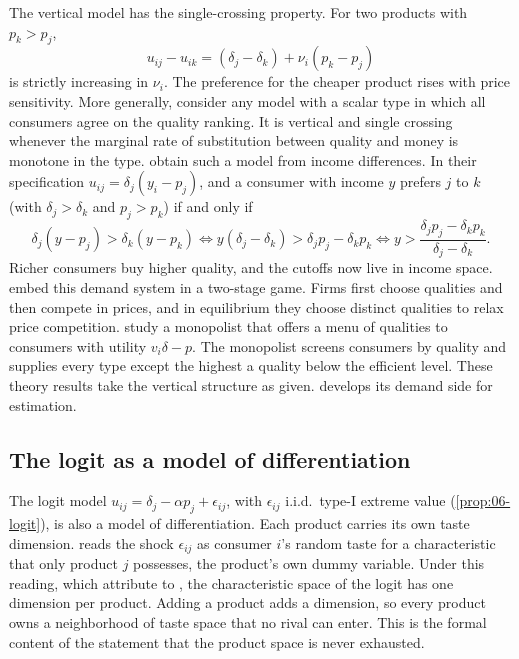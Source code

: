 The vertical model has the single-crossing property. For two products with $p_k > p_j$,
\begin{equation}\label{eq:06-vertical-sc}
  u_{ij} - u_{ik} = (\delta_j - \delta_k) + \nu_i(p_k - p_j)
\end{equation}
is strictly increasing in $\nu_i$. The preference for the cheaper product rises with price sensitivity.
More generally, consider any model with a scalar type in which all consumers agree on the quality ranking.
It is vertical and single crossing whenever the marginal rate of substitution between quality and money
is monotone in the type. \citet{GabszewiczThisse1979} obtain such a model from income differences. In their specification
$u_{ij} = \delta_j(y_i - p_j)$, and a consumer with income $y$ prefers $j$ to $k$ (with $\delta_j > \delta_k$
and $p_j > p_k$) if and only if
\begin{equation*}
  \delta_j(y - p_j) > \delta_k(y - p_k)
  \iff y(\delta_j - \delta_k) > \delta_j p_j - \delta_k p_k
  \iff y > \frac{\delta_j p_j - \delta_k p_k}{\delta_j - \delta_k} .
\end{equation*}
Richer consumers buy higher quality, and the cutoffs now live in income space. \citet{ShakedSutton1982}
embed this demand system in a two-stage game. Firms first choose qualities and then compete in prices,
and in equilibrium they choose distinct qualities to relax price competition. \citet{MussaRosen1978}
study a monopolist that offers a menu of qualities to consumers with utility $v_i\delta - p$. The
monopolist screens consumers by quality and supplies every type except the highest a quality below the
efficient level. These theory results take the vertical structure as given. 
develops its demand side for estimation.

\subsection{The logit as a model of differentiation}\label{sec:06-logitdiff}

The logit model $u_{ij} = \delta_j - \alpha p_j + \epsilon_{ij}$, with $\epsilon_{ij}$ i.i.d.\ type-I extreme
value (\cref{prop:06-logit}), is also a model of differentiation. Each product carries its own taste
dimension.  reads the shock $\epsilon_{ij}$ as consumer $i$'s random taste for
a characteristic that only product $j$ possesses, the product's own dummy variable. Under this reading, which
\citet{BerryPakes2007} attribute to \citet{CaplinNalebuff1991}, the characteristic space of the logit has one
dimension per product. Adding a product adds a dimension, so every product owns a
neighborhood of taste space that no rival can enter. This is the formal content of the statement that
the product space is never exhausted.

